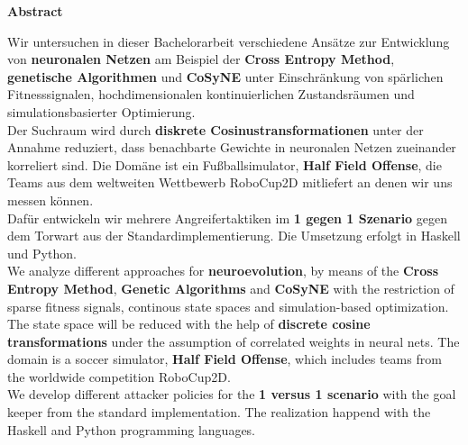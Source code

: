 %
%
\vspace*{2cm}

\begin{center}
    \textbf{Abstract}
\end{center}

\vspace*{1cm}

\noindent Wir untersuchen in dieser Bachelorarbeit verschiedene Ansätze zur Entwicklung von \textbf{neuronalen Netzen} am Beispiel der \textbf{Cross Entropy Method}, \textbf{genetische Algorithmen} und \textbf{CoSyNE} unter Einschränkung von spärlichen Fitnesssignalen, hochdimensionalen kontinuierlichen Zustandsräumen und simulationsbasierter Optimierung. \\[2mm]
\noindent
Der Suchraum wird durch \textbf{diskrete Cosinustransformationen} unter der Annahme reduziert, dass benachbarte Gewichte in neuronalen Netzen zueinander korreliert sind. Die Domäne ist ein Fußballsimulator, \textbf{Half Field Offense}, die Teams aus dem weltweiten Wettbewerb RoboCup2D mitliefert an denen wir uns messen können. \\[2mm]
\noindent
Dafür entwickeln wir mehrere Angreifertaktiken im \textbf{1 gegen 1 Szenario} gegen dem Torwart aus der Standardimplementierung. Die Umsetzung erfolgt in Haskell und Python. \\[10mm]


\noindent
We analyze different approaches for \textbf{neuroevolution}, by means of the \textbf{Cross Entropy Method}, \textbf{Genetic Algorithms} and \textbf{CoSyNE} with the restriction of sparse fitness signals, continous state spaces and simulation-based optimization. \\[2mm]
\noindent
The state space will be reduced with the help of \textbf{discrete cosine transformations} under the assumption of correlated weights in neural nets. The domain is a soccer simulator, \textbf{Half Field Offense}, which includes teams from the worldwide competition RoboCup2D. \\[2mm]
\noindent
We develop different attacker policies for the \textbf{1 versus 1 scenario} with the goal keeper from the standard implementation. The realization happend with the Haskell and Python programming languages.






